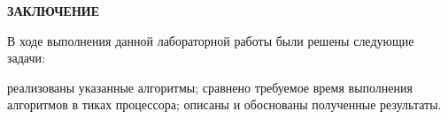 \begin{center}
    \textbf{ЗАКЛЮЧЕНИЕ}
\end{center}

В ходе выполнения данной лабораторной работы были решены следующие задачи:
\begin{itemize}
	\itemm реализованы указанные алгоритмы;
        \itemm сравнено требуемое время выполнения алгоритмов в тиках процессора;
        \itemm описаны и обоснованы полученные результаты.
\end{itemize}

